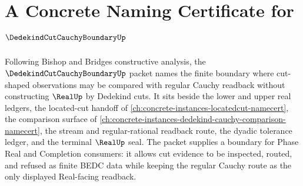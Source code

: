 \chapter{A Concrete Naming Certificate for $\DedekindCutCauchyBoundaryUp$}
\label{ch:concrete-instances-dedekind-cut-cauchy-boundary-namecert}

Following Bishop and Bridges constructive analysis, the $\DedekindCutCauchyBoundaryUp$ packet names the finite boundary where cut-shaped observations may be compared with regular Cauchy readback without constructing $\RealUp$ by Dedekind cuts. It sits beside the lower and upper real ledgers, the located-cut handoff of \autoref{ch:concrete-instances-locatedcut-namecert}, the comparison surface of \autoref{ch:concrete-instances-dedekind-cauchy-comparison-namecert}, the stream and regular-rational readback route, the dyadic tolerance ledger, and the terminal $\RealUp$ seal. The packet supplies a boundary for Phase Real and Completion consumers: it allows cut evidence to be inspected, routed, and refused as finite BEDC data while keeping the regular Cauchy route as the only displayed Real-facing readback.

